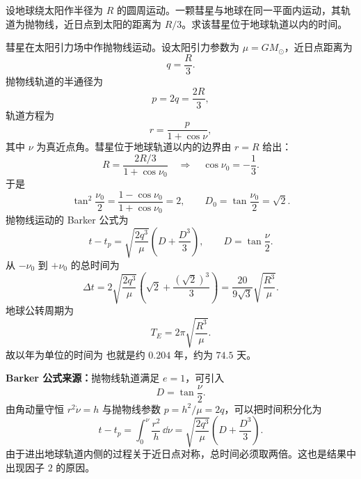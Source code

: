 \begin{question}[抛物线彗星的轨道时间]
设地球绕太阳作半径为 $R$ 的圆周运动。一颗彗星与地球在同一平面内运动，其轨道为抛物线，近日点到太阳的距离为 $R/3$。求该彗星位于地球轨道以内的时间。

\begin{solution}
彗星在太阳引力场中作抛物线运动。设太阳引力参数为 $\mu=GM_\odot$，近日点距离为
\[
  q=\frac R3.
\]
抛物线轨道的半通径为
\[
  p=2q=\frac{2R}{3},
\]
轨道方程为
\[
  r=\frac{p}{1+\cos\nu},
\]
其中 $\nu$ 为真近点角。彗星位于地球轨道以内的边界由 $r=R$ 给出：
\[
  R=\frac{2R/3}{1+\cos\nu_0}
  \quad\Longrightarrow\quad
  \cos\nu_0=-\frac13.
\]
于是
\[
  \tan^2\frac{\nu_0}{2}
  =\frac{1-\cos\nu_0}{1+\cos\nu_0}=2,
  \qquad
  D_0=\tan\frac{\nu_0}{2}=\sqrt2 .
\]
抛物线运动的 Barker 公式为
\[
  t-t_p=\sqrt{\frac{2q^3}{\mu}}\left(D+\frac{D^3}{3}\right),
  \qquad D=\tan\frac\nu2 .
\]
从 $-\nu_0$ 到 $+\nu_0$ 的总时间为
\[
  \Delta t=2\sqrt{\frac{2q^3}{\mu}}
  \left(\sqrt2+\frac{(\sqrt2)^3}{3}\right)
  =\frac{20}{9\sqrt3}\sqrt{\frac{R^3}{\mu}}.
\]
地球公转周期为
\[
  T_E=2\pi\sqrt{\frac{R^3}{\mu}}.
\]
故以年为单位的时间为
也就是约 $0.204$ 年，约为 $74.5$ 天。


\medskip
\textbf{Barker 公式来源：}抛物线轨道满足 $e=1$，可引入
\[
  D=\tan\frac\nu2.
\]
由角动量守恒 $r^2\dot\nu=h$ 与抛物线参数 $p=h^2/\mu=2q$，可以把时间积分化为
\[
  t-t_p=\int_0^\nu \frac{r^2}{h}\,\dd\nu
  =\sqrt{\frac{2q^3}{\mu}}\left(D+\frac{D^3}{3}\right).
\]
由于进出地球轨道内侧的过程关于近日点对称，总时间必须取两倍。这也是结果中出现因子 $2$ 的原因。
\end{solution}

\end{question}

